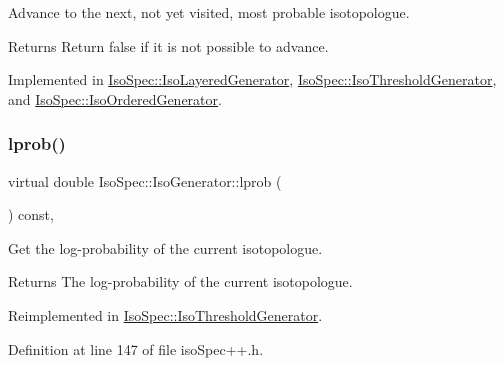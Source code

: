 Advance to the next, not yet visited, most probable isotopologue. 

\begin{DoxyReturn}{Returns}
Return false if it is not possible to advance. 
\end{DoxyReturn}


Implemented in \mbox{\hyperlink{class_iso_spec_1_1_iso_layered_generator_abce0871ac279fd54a0344ceb80126b66}{Iso\+Spec\+::\+Iso\+Layered\+Generator}}, \mbox{\hyperlink{class_iso_spec_1_1_iso_threshold_generator_a7164a6476b84665967c4a667a91d3f3e}{Iso\+Spec\+::\+Iso\+Threshold\+Generator}}, and \mbox{\hyperlink{class_iso_spec_1_1_iso_ordered_generator_aa2438bb81fb1d68eda1637d67e9cb36d}{Iso\+Spec\+::\+Iso\+Ordered\+Generator}}.

\mbox{\label{class_iso_spec_1_1_iso_generator_ae8e24abbce51a4c93994f630acfdf383}} 
\subsubsection{\texorpdfstring{lprob()}{lprob()}}
{\footnotesize\ttfamily virtual double Iso\+Spec\+::\+Iso\+Generator\+::lprob (\begin{DoxyParamCaption}{ }\end{DoxyParamCaption}) const\hspace{0.3cm}{\ttfamily [inline]}, {\ttfamily [virtual]}}



Get the log-\/probability of the current isotopologue. 

\begin{DoxyReturn}{Returns}
The log-\/probability of the current isotopologue. 
\end{DoxyReturn}


Reimplemented in \mbox{\hyperlink{class_iso_spec_1_1_iso_threshold_generator_a4aeebde03e385404d0175fd5696ff529}{Iso\+Spec\+::\+Iso\+Threshold\+Generator}}.



Definition at line 147 of file iso\+Spec++.\+h.

\mbox{\label{class_iso_spec_1_1_iso_generator_a34173228ef73e272e2ff0ae6ce58092d}} 
